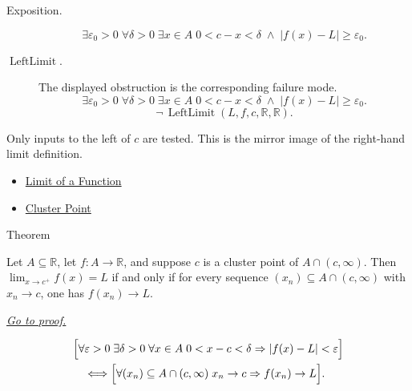 \begin{remark*}
\begin{description}
  \item[Exposition.]
\[
  \exists\varepsilon_0>0\;\forall\delta>0\;\exists x\in A\;
  0<c-x<\delta\;\wedge\; |f(x)-L|\geq\varepsilon_0.
\]


  \item[\(\operatorname{LeftLimit}.\)]
  The displayed obstruction is the corresponding failure mode.
  \[
\exists\varepsilon_0>0\;\forall\delta>0\;\exists x\in A\;
  0<c-x<\delta\;\wedge\; |f(x)-L|\geq\varepsilon_0.
  \]
  \[
\neg\,\operatorname{LeftLimit}(L,f,c,\mathbb{R},\mathbb{R}).
  \]
\end{description}
\end{remark*}

\begin{remark*}[Interpretation]
Only inputs to the left of $c$ are tested. This is the mirror image of
the right-hand limit definition.
\end{remark*}

\begin{dependencies}
\begin{itemize}
  \item \hyperref[def:limit-function]{Limit of a Function}
  \item \hyperref[def:cluster-point-r]{Cluster Point}
\end{itemize}
\end{dependencies}


\begin{theorembox}{Theorem}
\begin{theorem}
\label{thm:sequential-criterion-right-hand-limit}
Let $A\subseteq\mathbb{R}$, let $f:A\to\mathbb{R}$, and suppose $c$ is a
cluster point of $A\cap(c,\infty)$. Then $\lim_{x\to c^+}f(x)=L$ if and
only if for every sequence $(x_n)\subseteq A\cap(c,\infty)$ with
$x_n\to c$, one has $f(x_n)\to L$.

\smallskip\noindent
\hyperref[prf:sequential-criterion-right-hand-limit]{\textit{Go to proof.}}
\end{theorem}
\end{theorembox}

\begin{remark*}
\[
\begin{aligned}
&\Bigl[\forall\varepsilon>0\;\exists\delta>0\;\forall x\in A\;
  0<x-c<\delta\Rightarrow |f(x)-L|<\varepsilon\Bigr] \\
&\quad\Longleftrightarrow
\Bigl[\forall (x_n)\subseteq A\cap(c,\infty)\;
  x_n\to c\Rightarrow f(x_n)\to L\Bigr].
\end{aligned}
\]
\end{remark*}

